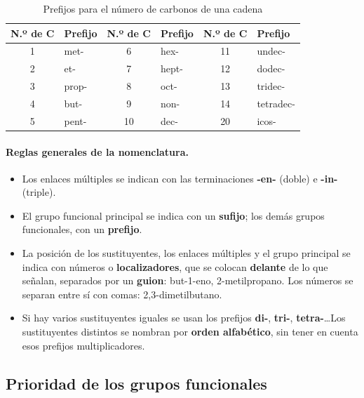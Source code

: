 \begin{table}[H]
    \centering
    \caption{Prefijos para el número de carbonos de una cadena}
    \vspace{-5pt}
    \begin{tabular}{@{}clclcl@{}}
        \toprule
        \textbf{N.º de C} & \textbf{Prefijo} & \textbf{N.º de C} & \textbf{Prefijo} & \textbf{N.º de C} & \textbf{Prefijo} \\
        \midrule
        1 & met- & 6 & hex- & 11 & undec- \\[3pt]
        2 & et- & 7 & hept- & 12 & dodec- \\[3pt]
        3 & prop- & 8 & oct- & 13 & tridec- \\[3pt]
        4 & but- & 9 & non- & 14 & tetradec- \\[3pt]
        5 & pent- & 10 & dec- & 20 & icos- \\
        \bottomrule
    \end{tabular}
    \label{tab:ud7-prefijos}
\end{table}

\paragraph{Reglas generales de la nomenclatura.}
\begin{itemize}
    \item Los enlaces múltiples se indican con las terminaciones \textbf{-en-} (doble) e \textbf{-in-} (triple).
    \item El grupo funcional principal se indica con un \textbf{sufijo}; los demás grupos funcionales, con un \textbf{prefijo}.
    \item La posición de los sustituyentes, los enlaces múltiples y el grupo principal se indica con números o
    \textbf{localizadores}, que se colocan \textbf{delante} de lo que señalan, separados por un \textbf{guion}: but-1-eno,
    2-metilpropano. Los números se separan entre sí con comas: 2,3-dimetilbutano.
    \item Si hay varios sustituyentes iguales se usan los prefijos \textbf{di-}, \textbf{tri-}, \textbf{tetra-}\ldots Los
    sustituyentes distintos se nombran por \textbf{orden alfabético}, sin tener en cuenta esos prefijos multiplicadores.
\end{itemize}

\subsection{Prioridad de los grupos funcionales}

